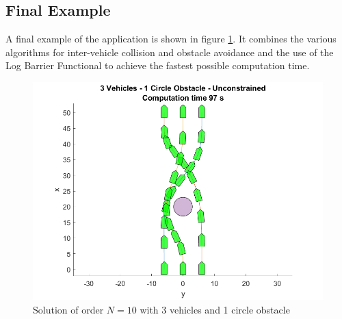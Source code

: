 \subsection{Final Example}
\par A final example of the application is shown in figure \ref{fig:finalexample}. It combines the various algorithms for inter-vehicle collision and obstacle avoidance  and the use of the Log Barrier Functional to achieve the fastest possible computation time.

\begin{figure}[h!]
\centering
\includegraphics[width=\textwidth]{Images/results/finalexample.png}
\caption{Solution of order $N=10$ with 3 vehicles and 1 circle obstacle}
\label{fig:finalexample}
\end{figure}

